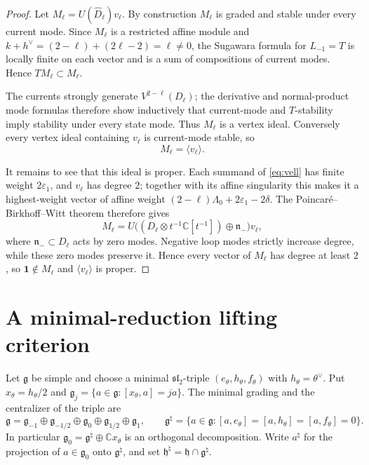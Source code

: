 \documentclass[11pt]{article}
\newcommand{\g}{\mathfrak g}
\begin{document}
\begin{proof}
Let $M_\ell=U(\widehat{D}_\ell)v_\ell$.  By construction $M_\ell$ is graded
and stable under every current mode.  Since $M_\ell$ is a restricted affine
module and $k+h^\vee=(2-\ell)+(2\ell-2)=\ell\ne0$, the Sugawara formula
for $L_{-1}=T$ is locally finite on each vector and is a sum of compositions
of current modes.  Hence $T M_\ell\subset M_\ell$.

The currents strongly generate $V^{2-\ell}(D_\ell)$; the derivative and
normal-product mode formulas therefore show inductively that current-mode and
$T$-stability imply stability under every state mode.  Thus $M_\ell$ is a
vertex ideal.  Conversely every vertex ideal containing $v_\ell$ is
current-mode stable, so
$$
 M_\ell=\langle v_\ell\rangle.
$$

It remains to see that this ideal is proper.  Each summand of
\eqref{eq:vell} has finite weight $2\varepsilon_1$, and $v_\ell$ has degree
$2$; together with its affine singularity this makes it a highest-weight
vector of affine weight $(2-\ell)\Lambda_0+2\varepsilon_1-2\delta$.
The Poincar\'e--Birkhoff--Witt theorem therefore gives
$$
 M_\ell
 =U\bigl((D_\ell\otimes t^{-1}\mathbb C[t^{-1}])
       \oplus\mathfrak n_-\bigr)v_\ell,
$$
where $\mathfrak n_-\subset D_\ell$ acts by zero modes.  Negative loop
modes strictly increase degree, while these zero modes preserve it.  Hence
every vector of $M_\ell$ has degree at least $2$, so $\mathbf1\notin M_\ell$
and $\langle v_\ell\rangle$ is proper.
\end{proof}

\section{A minimal-reduction lifting criterion}
\label{sec:maximality}

Let $\g$ be simple and choose a minimal $\mathfrak{sl}_2$-triple
$(e_\theta,h_\theta,f_\theta)$ with $h_\theta=\theta^\vee$.
Put $x_\theta=h_\theta/2$ and
$\g_j=\{a\in\g:[x_\theta,a]=ja\}$.
The minimal grading and the centralizer of the triple are
$$
 \g=\g_{-1}\oplus\g_{-1/2}\oplus\g_0\oplus\g_{1/2}\oplus\g_1,
 \qquad
 \g^\natural=\{a\in\g:[a,e_\theta]=[a,h_\theta]=[a,f_\theta]=0\}.
$$
In particular $\g_0=\g^\natural\oplus\mathbb Cx_\theta$ is an orthogonal
decomposition.  Write $a^\natural$ for the projection of $a\in\g_0$ onto
$\g^\natural$, and set $\mathfrak h^\natural=\mathfrak h\cap\g^\natural$.
\end{document}

